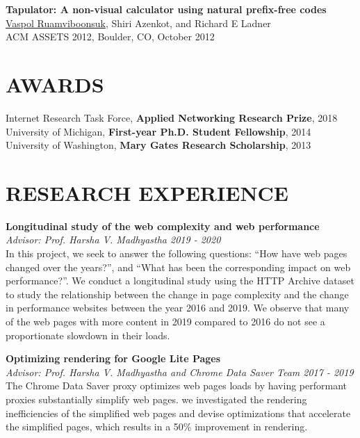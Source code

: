 \documentclass[zhemargin]{res}
\begin{document}
\begin{resume}
    \textbf{Tapulator: A non-visual calculator using natural prefix-free codes}\\
    \underline{Vaspol Ruamviboonsuk}, Shiri Azenkot, and Richard E Ladner\\
    ACM ASSETS 2012, Boulder, CO, October 2012

\section{\small AWARDS}
  Internet Research Task Force, \textbf{Applied Networking Research Prize}, 2018 \\
  University of Michigan, \textbf{First-year Ph.D. Student Fellowship}, 2014 \\
  University of Washington, \textbf{Mary Gates Research Scholarship}, 2013 \\

\section{\small RESEARCH EXPERIENCE}
  \textbf{Longitudinal study of the web complexity and web performance}\\
    \textit{Advisor: Prof. Harsha V. Madhyastha \hfill 2019 - 2020}\\
    In this project, we seek to answer the following questions: ``How have
      web pages changed over the years?'', and ``What has been the corresponding
      impact on web performance?''. We conduct a longitudinal study using the
      HTTP Archive dataset to study the relationship between the change in page
      complexity and the change in performance websites between the year 2016
      and 2019. We observe that many of the web pages with more content in 2019
      compared to 2016 do not see a proportionate slowdown in their loads.

  \textbf{Optimizing rendering for Google Lite Pages}\\
    \textit{Advisor: Prof. Harsha V. Madhyastha and Chrome Data Saver Team\hfill
    2017 - 2019}\\
    The Chrome Data Saver proxy optimizes web pages loads by having performant
    proxies substantially simplify web pages. we investigated the rendering
    inefficiencies of the simplified web pages and devise optimizations that
    accelerate the simplified pages, which results in a 50\% improvement in
    rendering.



\end{resume}
\end{document}
